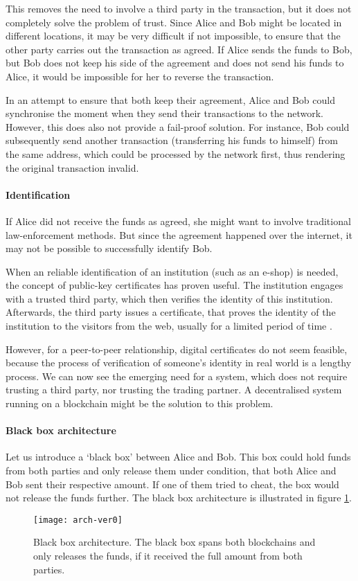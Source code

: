 This removes the need to involve a third party in the transaction, but it does not completely solve the problem of trust. Since Alice and Bob might be located in different locations, it may be very difficult if not impossible, to ensure that the other party carries out the transaction as agreed. If Alice sends the funds to Bob, but Bob does not keep his side of the agreement and does not send his funds to Alice, it would be impossible for her to reverse the transaction. 

In an attempt to ensure that both keep their agreement, Alice and Bob could synchronise the moment when they send their transactions to the network. However, this does also not provide a fail-proof solution. For instance, Bob could subsequently send another transaction (transferring his funds to himself) from the same address, which could be processed by the network first, thus rendering the original transaction invalid.

\paragraph{Identification} 
If Alice did not receive the funds as agreed, she might want to involve traditional law-enforcement methods. But since the agreement happened over the internet, it may not be possible to successfully identify Bob.

When an reliable identification of an institution (such as an e-shop) is needed, the concept of public-key certificates has proven useful. The institution engages with a trusted third party, which then verifies the identity of this institution. Afterwards, the third party issues a certificate, that proves the identity of the institution to the visitors from the web, usually for a limited period of time \cite{Lee2013SecurityArchitects}. 

However, for a peer-to-peer relationship, digital certificates do not seem feasible, because the process of verification of someone's identity in real world is a lengthy process. We can now see the emerging need for a system, which does not require trusting a third party, nor trusting the trading partner. A decentralised system running on a blockchain might be the solution to this problem.

\paragraph{Black box architecture}
Let us introduce a `black box' between Alice and Bob. This box could hold funds from both parties and only release them under condition, that both Alice and Bob sent their respective amount. If one of them tried to cheat, the box would not release the funds further. The black box architecture is illustrated in figure \ref{fig:arch-ver0}.
% 
\begin{figure}[ht]
    \centering
    \texttt{[image: arch-ver0]}
    \caption{Black box architecture. The black box spans both blockchains and only releases the funds, if it received the full amount from both parties.}
    \label{fig:arch-ver0}
\end{figure}

